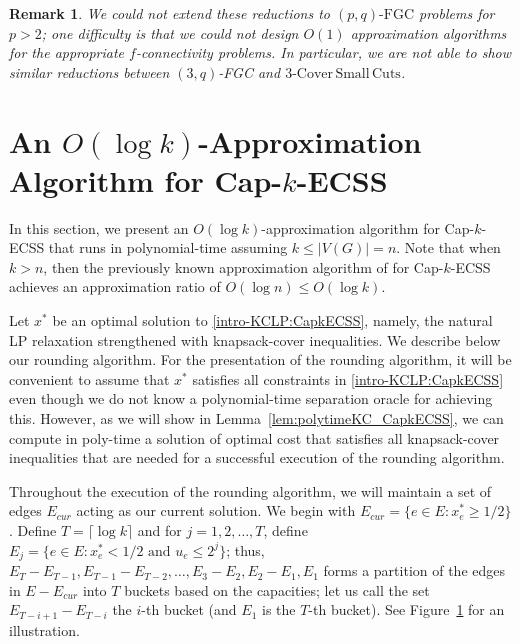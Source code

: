 \documentclass[11pt]{article}
\newtheorem*{remark}{Remark}
\newcommand{\fgc}{\mathrm{FGC}}
\newcommand{\pqfgc}{(p,q)\text{-}\fgc}
\newcommand\threeASC{\mathrm{3\text{-}Cover\,Small\,Cuts}}
\begin{document}
{{\begin{remark}
We could not extend these reductions to $\pqfgc$ problems for $p>2$;
one difficulty is that we could not design $O(1)$ approximation algorithms for the appropriate $f$-connectivity problems.
In particular, we are not able to show similar reductions between $(3,q)$-FGC and $\threeASC$.
\end{remark}
}
}

{
\section{An $O(\log{k})$-Approximation Algorithm for Cap-$k$-ECSS \label{sec:logk-approx}}

In this section, we present an $O(\log k)$-approximation algorithm for
Cap-$k$-ECSS that runs in polynomial-time assuming $k\leq|V(G)|=n$.
Note that when $k>n$, then the previously known approximation algorithm
of \cite{CCKK15} for Cap-$k$-ECSS achieves an approximation ratio of $O(\log{n})\leq{O(\log{k})}$.


Let $x^*$ be an optimal solution to \eqref{intro-KCLP:CapkECSS}, namely, the natural LP relaxation strengthened with knapsack-cover inequalities. We describe below our rounding algorithm. For the presentation of the rounding algorithm, it will be convenient to assume that $x^*$ satisfies all constraints in \eqref{intro-KCLP:CapkECSS} even though we do not know a polynomial-time separation oracle for achieving this. However, as we will show in Lemma~\ref{lem:polytimeKC_CapkECSS}, we can compute in poly-time a solution of optimal cost that satisfies all knapsack-cover inequalities that are needed for a successful execution of the rounding algorithm.

Throughout the execution of the rounding algorithm, we will maintain a set of
edges $E_{cur}$ acting as our current solution.
We begin with $E_{cur} = \{e\in E:x^*_e \geq 1/2\}$.
Define $T = \lceil \log k\rceil$ and
for $j=1,2,\ldots,T$,
define $E_j = \{e\in E: x^*_e < 1/2 \text{ and } u_e \leq 2^j\}$;
thus,
$E_T-E_{T-1}, E_{T-1}-E_{T-2}, \ldots, E_3-E_2, E_2-E_1, E_1$
forms a partition of the edges in $E - E_{cur}$ into $T$ buckets
based on the capacities;
let us call the set $E_{T-i+1} - E_{T-i}$ the $i$-th bucket
(and $E_1$ is the $T$-th bucket).
See Figure~\ref{fig:E-buckets} for an illustration.


\begin{figure}[htb] \label{fig:E-buckets}
{
\begin{tikzpicture}


\end{tikzpicture}}
\end{figure}}
\end{document}
